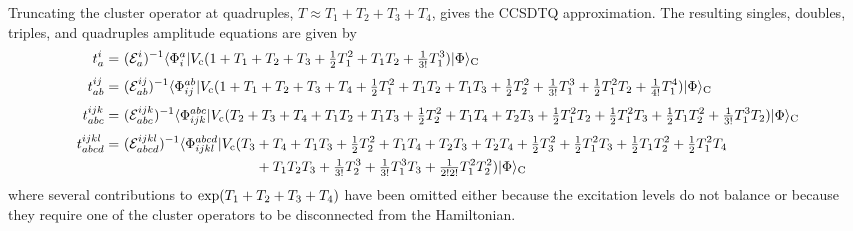 \documentclass[11pt]{article}
\numberwithin{equation}{section}
\begin{document}
\begin{ex}
Truncating the cluster operator at quadruples, $T\approx T_1 + T_2 + T_3 + T_4$, gives the CCSDTQ approximation.
The resulting singles, doubles, triples, and quadruples amplitude equations are given by\begin{align}
\nonumber
  t_a^i
=&\
  (\mc{E}_a^i)^{-1}
  \ip{\F_i^a|
    V_\mr{c}
    (
      1
    +
      T_1
    +
      T_2
    +
      T_3
    +
      \tfr{1}{2}
      T_1^2
    +
      T_1T_2
    +
      \tfr{1}{3!}
      T_1^3
    )
  |\F}_\mr{C}
\\[3pt]
\nonumber
  t_{ab}^{ij}
=&\
  (\mc{E}_{ab}^{ij})^{-1}
  \br{\F_{ij}^{ab}}
    V_\mr{c}
    (
      1
    +
      T_1
    +
      T_2
    +
      T_3
    +
      T_4
    +
      \tfr{1}{2}
      T_1^2
    +
      T_1T_2
    +
      T_1T_3
    +
      \tfr{1}{2}
      T_2^2
    +
      \tfr{1}{3!}
      T_1^3
    +
      \tfr{1}{2}
      T_1^2T_2
    +
      \tfr{1}{4!}
      T_1^4
    )
  \kt{\F}_\mr{C}
\\[3pt]
\nonumber
  t_{abc}^{ijk}
=&\
  (\mc{E}_{abc}^{ijk})^{-1}
  \br{\F_{ijk}^{abc}}
    V_\mr{c}
    (
      T_2
    +
      T_3
    +
      T_4
    +
      T_1T_2
    +
      T_1T_3
    +
      \tfr{1}{2}
      T_2^2
    +
      T_1T_4
    +
      T_2T_3
    +
      \tfr{1}{2}
      T_1^2T_2
    +
      \tfr{1}{2}
      T_1^2T_3
    +
      \tfr{1}{2}
      T_1T_2^2
    +
      \tfr{1}{3!}
      T_1^3T_2
    )
  \kt{\F}_\mr{C}
\\[3pt]
\nonumber
  t_{abcd}^{ijkl}
=&\
  (\mc{E}_{abcd}^{ijkl})^{-1}
  \br{\F_{ijkl}^{abcd}}
    V_\mr{c}
    (
      T_3
    +
      T_4
    +
      T_1T_3
    +
      \tfr{1}{2}
      T_2^2
    +
      T_1T_4
    +
      T_2T_3
    +
      T_2T_4
    +
      \tfr{1}{2}
      T_3^2
    +
      \tfr{1}{2}
      T_1^2T_3
    +
      \tfr{1}{2}
      T_1T_2^2
    +
      \tfr{1}{2}
      T_1^2T_4
\\
\nonumber
&
\hphantom{
  (\mc{E}_{abcd}^{ijkl})^{-1}
  \br{\F_{ijkl}^{abcd}}
    V_\mr{c}
    (
      T_3\ 
 }
    +
      T_1T_2T_3
    +
      \tfr{1}{3!}
      T_2^3
    +
      \tfr{1}{3!}
      T_1^3T_3
    +
      \tfr{1}{2!2!}
      T_1^2T_2^2
    )
  \kt{\F}_\mr{C}
\end{align}
where several contributions to $\mathrm{exp}(T_1+T_2+T_3+T_4)$ have been omitted either because the excitation levels do not balance or because they require one of the cluster operators to be disconnected from the Hamiltonian.
\end{ex}
\end{document}
